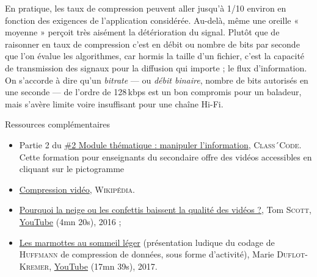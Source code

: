 En pratique, les taux de compression peuvent aller jusqu'à 1/10 environ en fonction des exigences de l'application considérée. Au-delà, même une oreille « moyenne » perçoit très aisément la détérioration du signal. Plutôt que de raisonner en taux de compression c'est en débit ou nombre de bits par seconde que l'on évalue les algorithmes, car hormis la taille d'un fichier, c'est la capacité de transmission des signaux pour la diffusion qui importe ; le flux d'information. On s'accorde à dire qu'un \textit{bitrate} --- ou \emph{débit binaire}, nombre de bits autorisés en une seconde --- de l'ordre de 128\,kbps est un bon compromis pour un baladeur, mais s'avère limite voire insuffisant pour une chaîne Hi-Fi.

\begin{gofurther}{Ressources complémentaires}
\begin{itemize}\jazzitem
	\item Partie 2 du \href{https://pixees.fr/classcode/formations/module2/#partie2}{\#2 Module thématique : manipuler l’information}, \textsc{Class´Code}. Cette formation pour enseignants du secondaire offre des vidéos accessibles en cliquant sur le pictogramme 
\end{itemize}

\begin{itemize}\jazzitem
	\item \href{https://fr.wikipedia.org/wiki/Compression_vid\%C3\%A9o}{Compression vidéo}, \textsc{Wikipédia}.
\end{itemize}

\begin{itemize}\jazzitem
	\item \href{https://www.koreus.com/video/pouquoi-neige-confettis-qualite-video.html}{Pourquoi la neige ou les confettis baissent la qualité des vidéos ?}, Tom \textsc{Scott}, \href{https://youtu.be/r6Rp-uo6HmI?t=9}{YouTube} (4mn 20s), 2016 ;
	\item \href{https://www.youtube.com/watch?v=oqMx1cuw6mo&index=10&list=PLWvGMqXvyJAPSMFgCiy6qVHW9bAPu93X5}{Les marmottes au sommeil léger} (présentation ludique du codage de \textsc{Huffmann} de compression de données, sous forme d'activité), Marie \textsc{Duflot-Kremer}, \href{https://www.youtube.com/watch?v=oqMx1cuw6mo&index=10&list=PLWvGMqXvyJAPSMFgCiy6qVHW9bAPu93X5}{YouTube} (17mn 39s), 2017.
\end{itemize}
\end{gofurther}


